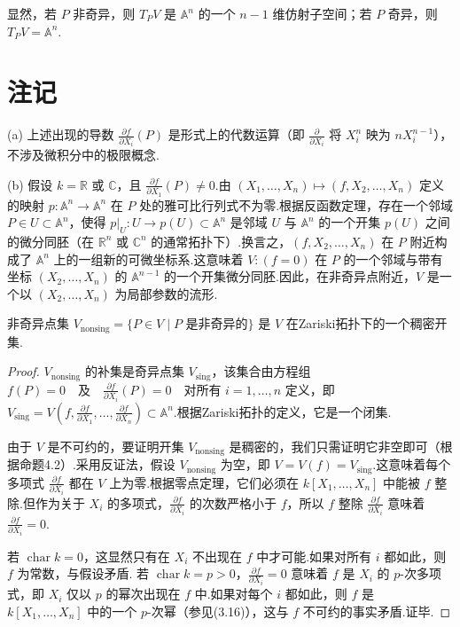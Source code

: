 显然，若 \(P\) 非奇异，则 \(T_P V\) 是 \(\mathbb{A}^n\) 的一个 \(n-1\) 维仿射子空间；若 \(P\) 奇异，则 \(T_P V = \mathbb{A}^n\).

\section{注记}

(a) 上述出现的导数 \(\frac{\partial f}{\partial X_i}(P)\) 是形式上的代数运算（即 \(\frac{\partial}{\partial X_i}\) 将 \(X_i^n\) 映为 \(nX_i^{n-1}\)），不涉及微积分中的极限概念.

(b) 假设 \(k = \mathbb{R}\) 或 \(\mathbb{C}\)，且 \(\frac{\partial f}{\partial X_1}(P) \neq 0\).由 \((X_1, \ldots, X_n) \mapsto (f, X_2, \ldots, X_n)\) 定义的映射 \(p: \mathbb{A}^n \to \mathbb{A}^n\) 在 \(P\) 处的雅可比行列式不为零.根据反函数定理，存在一个邻域 \(P \in U \subset \mathbb{A}^n\)，使得 \(p|_U: U \to p(U) \subset \mathbb{A}^n\) 是邻域 \(U\) 与 \(\mathbb{A}^n\) 的一个开集 \(p(U)\) 之间的微分同胚（在 \(\mathbb{R}^n\) 或 \(\mathbb{C}^n\) 的通常拓扑下）.换言之，\((f, X_2, \ldots, X_n)\) 在 \(P\) 附近构成了 \(\mathbb{A}^n\) 上的一组新的可微坐标系.这意味着 \(V: (f=0)\) 在 \(P\) 的一个邻域与带有坐标 \((X_2, \ldots, X_n)\) 的 \(\mathbb{A}^{n-1}\) 的一个开集微分同胚.因此，在非奇异点附近，\(V\) 是一个以 \((X_2, \ldots, X_n)\) 为局部参数的流形.

\begin{proposition}
非奇异点集 \(V_{\text{nonsing}} = \{ P \in V \mid P \text{ 是非奇异的} \}\) 是 \(V\) 在Zariski拓扑下的一个稠密开集.
\end{proposition}
\begin{proof}
\(V_{\text{nonsing}}\) 的补集是奇异点集 \(V_{\text{sing}}\)，该集合由方程组
\(
f(P) = 0 \quad \text{及} \quad \frac{\partial f}{\partial X_i}(P) = 0 \quad \text{对所有 } i=1, \ldots, n
\)
定义，即 \(V_{\text{sing}} = V(f, \frac{\partial f}{\partial X_1}, \ldots, \frac{\partial f}{\partial X_n}) \subset \mathbb{A}^n\).根据Zariski拓扑的定义，它是一个闭集.

由于 \(V\) 是不可约的，要证明开集 \(V_{\text{nonsing}}\) 是稠密的，我们只需证明它非空即可（根据命题4.2）.采用反证法，假设 \(V_{\text{nonsing}}\) 为空，即 \(V = V(f) = V_{\text{sing}}\).这意味着每个多项式 \(\frac{\partial f}{\partial X_i}\) 都在 \(V\) 上为零.根据零点定理，它们必须在 \(k[X_1, \ldots, X_n]\) 中能被 \(f\) 整除.但作为关于 \(X_i\) 的多项式，\(\frac{\partial f}{\partial X_i}\) 的次数严格小于 \(f\)，所以 \(f\) 整除 \(\frac{\partial f}{\partial X_i}\) 意味着 \(\frac{\partial f}{\partial X_i} = 0\).

若 \(\operatorname{char} k = 0\)，这显然只有在 \(X_i\) 不出现在 \(f\) 中才可能.如果对所有 \(i\) 都如此，则 \(f\) 为常数，与假设矛盾.
若 \(\operatorname{char} k = p > 0\)，\(\frac{\partial f}{\partial X_i} = 0\) 意味着 \(f\) 是 \(X_i\) 的 \(p\)-次多项式，即 \(X_i\) 仅以 \(p\) 的幂次出现在 \(f\) 中.如果对每个 \(i\) 都如此，则 \(f\) 是 \(k[X_1, \ldots, X_n]\) 中的一个 \(p\)-次幂（参见(3.16)），这与 \(f\) 不可约的事实矛盾.证毕.
\end{proof}

